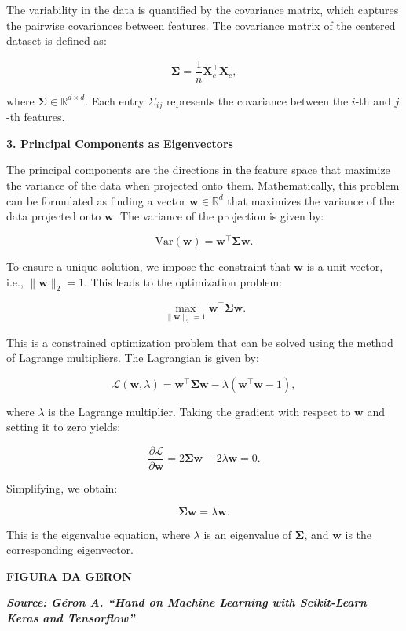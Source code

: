 \documentclass{article}
\begin{document}
The variability in the data is quantified by the covariance matrix,
which captures the pairwise covariances between features. The covariance
matrix of the centered dataset is defined as:

\[
\mathbf{\Sigma} = \frac{1}{n} \mathbf{X}_c^\top \mathbf{X}_c,
\]

where \(\mathbf{\Sigma} \in \mathbb{R}^{d \times d}\). Each entry
\(\Sigma_{ij}\) represents the covariance between the \(i\)-th and
\(j\)-th features.

    \textbf{3. Principal Components as Eigenvectors}

The principal components are the directions in the feature space that
maximize the variance of the data when projected onto them.
Mathematically, this problem can be formulated as finding a vector
\(\mathbf{w} \in \mathbb{R}^d\) that maximizes the variance of the data
projected onto \(\mathbf{w}\). The variance of the projection is given
by:

\[
\text{Var}(\mathbf{w}) = \mathbf{w}^\top \mathbf{\Sigma} \mathbf{w}.
\]

To ensure a unique solution, we impose the constraint that
\(\mathbf{w}\) is a unit vector, i.e., \(\|\mathbf{w}\|_2 = 1\). This
leads to the optimization problem:

\[
\max_{\|\mathbf{w}\|_2=1} \mathbf{w}^\top \mathbf{\Sigma} \mathbf{w}.
\]

This is a constrained optimization problem that can be solved using the
method of Lagrange multipliers. The Lagrangian is given by:

\[
\mathcal{L}(\mathbf{w}, \lambda) = \mathbf{w}^\top \mathbf{\Sigma} \mathbf{w} - \lambda (\mathbf{w}^\top \mathbf{w} - 1),
\]

where \(\lambda\) is the Lagrange multiplier. Taking the gradient with
respect to \(\mathbf{w}\) and setting it to zero yields:

\[
\frac{\partial \mathcal{L}}{\partial \mathbf{w}} = 2\mathbf{\Sigma} \mathbf{w} - 2\lambda \mathbf{w} = 0.
\]

Simplifying, we obtain:

\[
\mathbf{\Sigma} \mathbf{w} = \lambda \mathbf{w}.
\]

This is the eigenvalue equation, where \(\lambda\) is an eigenvalue of
\(\mathbf{\Sigma}\), and \(\mathbf{w}\) is the corresponding
eigenvector.

    \textbf{FIGURA DA GERON}

    \textbf{\emph{Source: Géron A. ``Hand on Machine Learning with
Scikit-Learn Keras and Tensorflow''}}
\end{document}
